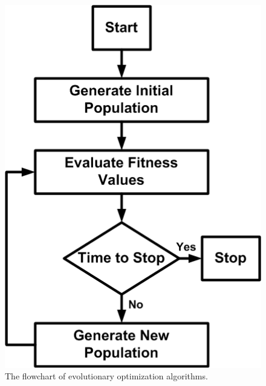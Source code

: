 \begin{figure} %
  \begin{center}
  \includegraphics[width=\linewidth]{EvolutionaryAlgsFC.png}
  \caption{{The flowchart of evolutionary optimization algorithms.}}\label{fig:EvolutionaryAlgsFC}
\endminipage\hfill
{}

\end{center}
\end{figure}
